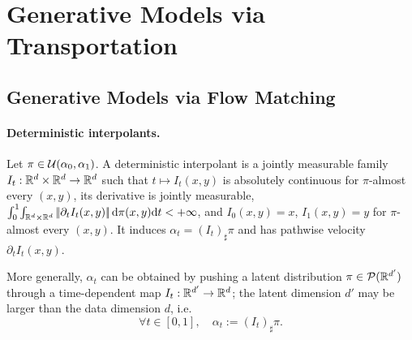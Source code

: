 \section{Generative Models via Transportation}
\label{sec-generative-models-transportation}
\subsection{Generative Models via Flow Matching}
\label{sec-generative-flow-matching}
\paragraph{Deterministic interpolants.}
\begin{defn}\label{def-deterministic-interpolant}
Let \(\pi\in\mathcal{U}(\alpha_0,\alpha_1)\). A deterministic interpolant is a jointly measurable family \(I_t:\mathbb{R}^d\times\mathbb{R}^d\to\mathbb{R}^d\) such that \(t\mapsto I_t(x,y)\) is absolutely continuous for \(\pi\)-almost every \((x,y)\), its derivative is jointly measurable, \(\int_0^1\!\int_{\mathbb{R}^d\times\mathbb{R}^d}|\!| \partial_t I_t(x,y) |\!|\,\mathrm{d}\pi(x,y)\mathrm{d} t<+\infty\), and \(I_0(x,y)=x\), \(I_1(x,y)=y\) for \(\pi\)-almost every \((x,y)\).
It induces \(\alpha_t=(I_t)_\sharp\pi\) and has pathwise velocity \(\partial_t I_t(x,y)\).
\end{defn}
More generally, $\alpha_t$ can be obtained by pushing a latent distribution $\pi \in \mathcal{P}(\mathbb{R}^{d'})$ through a time-dependent map $I_t: \mathbb{R}^{d'} \to \mathbb{R}^d$; the latent dimension $d'$ may be larger than the data dimension $d$, i.e.
\begin{equation}\label{eq:interp-coupling}
\forall t \in [0,1], \quad \alpha_t:= (I_t)_\sharp \pi.
\end{equation}
